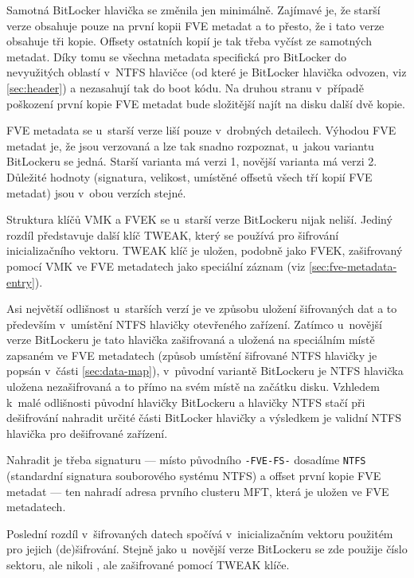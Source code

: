 Samotná BitLocker hlavička se změnila jen minimálně. Zajímavé je, že starší verze obsahuje  pouze na první kopii FVE metadat a to přesto, že i tato verze obsahuje tři kopie. Offsety ostatních kopií je tak třeba vyčíst ze samotných metadat. Díky tomu se všechna metadata specifická pro BitLocker  do nevyužitých oblastí v~NTFS hlavičce (od které je BitLocker hlavička odvozen, viz \ref{sec:header}) a nezasahují tak do boot kódu. Na druhou stranu v~případě poškození první kopie FVE metadat bude složitější najít na disku další dvě  kopie.


FVE metadata se u~starší verze liší pouze v~drobných detailech. Výhodou FVE metadat je, že jsou verzovaná a lze tak snadno rozpoznat, u~jakou variantu BitLockeru se jedná. Starší varianta má verzi 1, novější varianta má verzi 2. Důležité hodnoty (signatura, velikost, umístěné offsetů všech tří kopií FVE metadat) jsou v~obou verzích stejné.


Struktura klíčů VMK a FVEK se u~starší verze BitLockeru nijak neliší. Jediný rozdíl představuje další klíč TWEAK, který se používá pro šifrování inicializačního vektoru. TWEAK klíč je uložen, podobně jako FVEK, zašifrovaný pomocí VMK ve FVE metadatech jako speciální záznam (viz \ref{sec:fve-metadata-entry}).


Asi největší odlišnost u~starších verzí je ve způsobu uložení šifrovaných dat a to především v~umístění NTFS hlavičky otevřeného zařízení. Zatímco u~novější verze BitLockeru je tato hlavička zašifrovaná a uložená na speciálním místě zapsaném ve FVE metadatech (způsob umístění šifrované NTFS hlavičky je popsán v~části \ref{sec:data-map}), v~původní variantě BitLockeru je NTFS hlavička uložena nezašifrovaná a to přímo na svém  místě na začátku disku. Vzhledem k~malé odlišnosti původní hlavičky BitLockeru a hlavičky NTFS stačí při dešifrování nahradit určité části BitLocker hlavičky a výsledkem je validní NTFS hlavička pro dešifrované zařízení. 

Nahradit je třeba signaturu --- místo původního \texttt{-FVE-FS-} dosadíme \texttt{NTFS} (standardní signatura souborového systému NTFS) a offset první kopie FVE metadat --- ten nahradí adresa prvního clusteru MFT, která je uložen ve FVE metadatech.\cite{Metz2011}

Poslední rozdíl v~šifrovaných datech spočívá v~inicializačním vektoru použitém pro jejich (de)šifrování. Stejně jako u~novější verze BitLockeru se zde použije číslo sektoru, ale nikoli , ale zašifrované pomocí TWEAK klíče.

